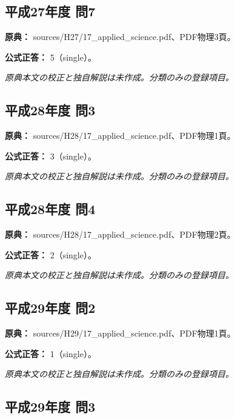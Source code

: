 \subsection{平成27年度 問7}
\label{q:h27-reg-applied-07}

\noindent\textbf{原典：} sources/H27/17\_applied\_science.pdf、PDF物理3頁。

\textbf{公式正答：} 5（single）。

\par\textit{原典本文の校正と独自解説は未作成。分類のみの登録項目。}

\subsection{平成28年度 問3}
\label{q:h28-reg-applied-03}

\noindent\textbf{原典：} sources/H28/17\_applied\_science.pdf、PDF物理1頁。

\textbf{公式正答：} 3（single）。

\par\textit{原典本文の校正と独自解説は未作成。分類のみの登録項目。}

\subsection{平成28年度 問4}
\label{q:h28-reg-applied-04}

\noindent\textbf{原典：} sources/H28/17\_applied\_science.pdf、PDF物理2頁。

\textbf{公式正答：} 2（single）。

\par\textit{原典本文の校正と独自解説は未作成。分類のみの登録項目。}

\subsection{平成29年度 問2}
\label{q:h29-reg-applied-02}

\noindent\textbf{原典：} sources/H29/17\_applied\_science.pdf、PDF物理1頁。

\textbf{公式正答：} 1（single）。

\par\textit{原典本文の校正と独自解説は未作成。分類のみの登録項目。}

\subsection{平成29年度 問3}
\label{q:h29-reg-applied-03}

